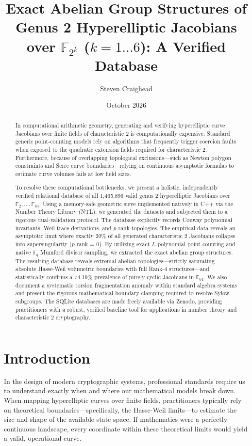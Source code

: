 \documentclass[11pt,letterpaper]{article}
\title{Exact Abelian Group Structures of Genus 2 Hyperelliptic Jacobians over \texorpdfstring{$\mathbb{F}_{2^k}$}{F\_2\textasciicircum k} (\texorpdfstring{$k=1 \dots 6$}{k=1..6}): A Verified Database}
\author{Steven Craighead}
\date{October 2026}
\begin{document}
\raggedright

\maketitle

\begin{abstract}
In computational arithmetic geometry, generating and verifying hyperelliptic curve Jacobians over finite fields of characteristic 2 is computationally expensive. Standard generic point-counting models rely on algorithms that frequently trigger coercion faults when exposed to the quadratic extension fields required for characteristic 2. Furthermore, because of overlapping topological exclusions---such as Newton polygon constraints and Serre curve boundaries---relying on continuous asymptotic formulas to estimate curve volumes fails at low field sizes. 

To resolve these computational bottlenecks, we present a holistic, independently verified relational database of all 1,465,896 valid genus 2 hyperelliptic Jacobians over $\mathbb{F}_2, \dots, \mathbb{F}_{64}$. Using a memory-safe geometric sieve implemented natively in C++ via the Number Theory Library (NTL), we generated the datasets and subjected them to a rigorous dual-validation protocol. The database explicitly records Conway polynomial invariants, Weil trace derivations, and $p$-rank topologies. The empirical data reveals an asymptotic limit where exactly 20\% of all generated characteristic 2 Jacobians collapse into supersingularity ($p$-rank = 0). By utilizing exact $L$-polynomial point counting and native $\mathbb{F}_q$ Mumford divisor sampling, we extracted the exact abelian group structures. The resulting database reveals extremal abelian topologies---strictly saturating absolute Hasse-Weil volumetric boundaries with full Rank-4 structures---and statistically confirms a 74.19\% prevalence of purely cyclic Jacobians in $\mathbb{F}_{64}$. We also document a systematic torsion fragmentation anomaly within standard algebra systems and present the rigorous mathematical boundary clamping required to resolve Sylow subgroups. The SQLite databases are made freely available via Zenodo, providing practitioners with a robust, verified baseline tool for applications in number theory and characteristic 2 cryptography.
\end{abstract}

\section{Introduction}
In the design of modern cryptographic systems, professional standards require us to understand exactly when and where our mathematical models break down. When mapping hyperelliptic curves over finite fields, practitioners typically rely on theoretical boundaries---specifically, the Hasse-Weil limits---to estimate the size and shape of the available state space. If mathematics were a perfectly continuous landscape, every coordinate within these theoretical limits would yield a valid, operational curve.
\end{document}
